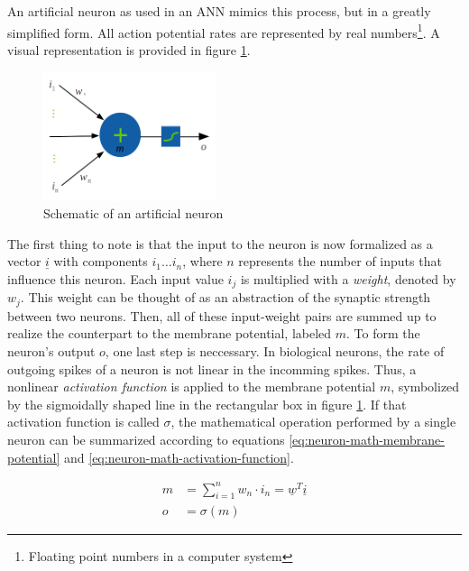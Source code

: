 \documentclass[11pt, a4paper]{article}
\newcommand\braces[1]{\left(#1\right)}
\renewcommand{\vec}[1]{\underline{#1}}
\begin{document}
An artificial neuron as used in an ANN mimics this process, but in a greatly simplified form. All action potential rates are represented by real numbers\footnote{Floating point numbers in a computer system}. A visual representation is provided in figure \ref{fig:artificial-neuron-schematic}.


\begin{figure}[h!tb]
	\centering
	\includegraphics[width=0.45\textwidth]{images/artificial_neuron.png}
	\caption[Artificial neuron]{Schematic of an artificial neuron}
	\label{fig:artificial-neuron-schematic}
\end{figure}

The first thing to note is that the input to the neuron is now formalized as a vector $\vec{i}$ with components $i_1 \dots i_n$, where $n$ represents the number of inputs that influence this neuron. Each input value $i_j$ is multiplied with a \emph{weight}, denoted by $w_j$. This weight can be thought of as an abstraction of the synaptic strength between two neurons. Then, all of these input-weight pairs are summed up to realize the counterpart to the membrane potential, labeled $m$. To form the neuron's output $o$, one last step is neccessary. In biological neurons, the rate of outgoing spikes of a neuron is not linear in the incomming spikes. Thus, a nonlinear \emph{activation function} is applied to the membrane potential $m$, symbolized by the sigmoidally shaped line in the rectangular box in figure \ref{fig:artificial-neuron-schematic}. If that activation function is called $\sigma$, the mathematical operation performed by a single neuron can be summarized according to equations \eqref{eq:neuron-math-membrane-potential} and \eqref{eq:neuron-math-activation-function}.

\begin{align}
	m &= \sum_{i=1}^n w_n \cdot i_n = \vec{w}^T \vec{i} \label{eq:neuron-math-membrane-potential} \\
	o &= \sigma \braces{m} \label{eq:neuron-math-activation-function}
\end{align}
\end{document}
